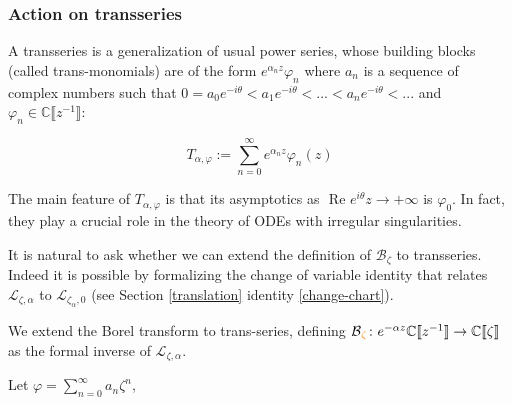 \documentclass{article}
\theoremstyle{definition}
\newcommand{\maps}{\colon}
\newcommand{\C}{\mathbb{C}}
\newcommand{\laplace}{\mathcal{L}}
\newcommand{\borel}{\mathcal{B}}
\begin{document}
\subsubsection{Action on transseries}\label{sec:action_transseries}

A transseries is a generalization of usual power series, whose building blocks (called trans-monomials) are of the form $e^{\alpha_n z}\varphi_n$ where $a_n$ is a sequence of complex numbers such that $0=a_0 e^{-i\theta}< a_1 e^{-i\theta}<...<a_n e^{-i\theta}<...$ and $\varphi_n\in\C\llbracket z^{-1}\rrbracket$: 

\[T_{\alpha,\varphi}:=\sum_{n=0}^{\infty} e^{\alpha_n z} \varphi_n(z) \]

The main feature of $T_{\alpha,\varphi}$ is that its asymptotics as $\text{ Re } e^{i\theta}z \to +\infty$ is $\varphi_0$. In fact, they play a crucial role in the theory of ODEs with irregular singularities. 

It is natural to ask whether we can extend the definition of $\borel_\zeta$ to transseries. Indeed it is possible by formalizing the change of variable identity that relates $\laplace_{\zeta, \alpha}$ to $\laplace_{\zeta_\alpha, 0}$ (see Section \ref{translation} identity \eqref{change-chart}). 

We extend the Borel transform to trans-series, defining $\borel\textcolor{orange}{_\zeta} \maps e^{-\alpha z} \C\llbracket z^{-1} \rrbracket \to \C\llbracket \zeta \rrbracket$ as the formal inverse of $\laplace_{\zeta, \alpha}$.

Let $\varphi=\sum_{n=0}^{\infty}a_n\zeta^n$, %
\end{document}

